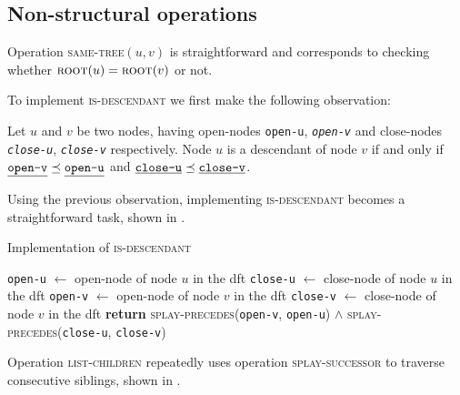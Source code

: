 \documentclass[a4paper,USenglish]{lipics}
\newcommand{\var}[1]{\textrm{\texttt{#1}}}
\begin{document}
		\subsection{Non-structural operations}
		Operation \textsc{same-tree}$(u,v)$ is straightforward and corresponds to checking whether $\textsc{root}(u) = \textsc{root}(v)$ or not.
		
		To implement \textsc{is-descendant} we first make the following observation:
		\begin{lemma}
			\item Let $u$ and $v$ be two nodes, having open-nodes {\var{open-u}}, \emph{\var{open-v}} and close-nodes \emph{\var{close-u}}, \emph{\var{close-v}} respectively. Node $u$ is a descendant of node $v$ if and only if $\emph{\var{open-v}} \preceq \emph{\var{open-u}}$ and $\emph{\var{close-u}} \preceq \emph{\var{close-v}}$.
		\end{lemma}
		Using the previous observation, implementing \textsc{is-descendant} becomes a straightforward task, shown in .
		\begin{algorithm}[H]
		  \small
		  \caption{\small Implementation of \textsc{is-descendant}}
		  \label{algo:is descendant}
		  \begin{algorithmic}[1]
			    \State \var{open-u} $\gets$ open-node of node $u$ in the dft
			    \State \var{close-u} $\gets$ close-node of node $u$ in the dft
			    \State \var{open-v} $\gets$ open-node of node $v$ in the dft
			    \State \var{close-v} $\gets$ close-node of node $v$ in the dft
			    \State \textbf{return} \textsc{splay-precedes}(\var{open-v}, \var{open-u}) $\land$ \textsc{splay-precedes}(\var{close-u}, \var{close-v})
		    \EndProcedure
		  \end{algorithmic}
		\end{algorithm}
		
		Operation \textsc{list-children} repeatedly uses operation \textsc{splay-successor} to traverse consecutive siblings, shown in .
		
\end{document}
